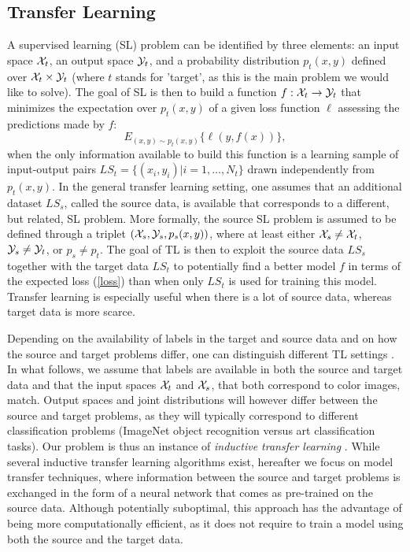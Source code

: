 \subsection{Transfer Learning}
\label{subsec: tl}

A supervised learning (SL) problem can be identified by three elements: an input space ${\cal X}_t$, an output space ${\cal Y}_t$, and a probability distribution $p_t(x,y)$ defined over ${\cal X}_t\times {\cal Y}_t$ (where $t$ stands for 'target', as this is the main problem we would like to solve). The goal of SL is then to build a function $f:{\cal X}_t\rightarrow{\cal Y}_t$ that minimizes the expectation over $p_t(x,y)$ of a given loss function $\ell$ assessing the predictions made by $f$:
\begin{equation}\label{loss}
  E_{(x,y)\sim p_t(x,y)} \{\ell(y,f(x))\},
\end{equation}
when the only information available to build this function is a learning sample of input-output pairs $LS_t=\{(x_i,y_i)|i=1,\ldots,N_t\}$ drawn independently from $p_t(x,y)$. In the general transfer learning setting, one assumes that an additional dataset $LS_s$, called the source data, is available that corresponds to a different, but related, SL problem. More formally, the source SL problem is assumed to be defined through a triplet $({\cal X}_s,{\cal Y}_s,p_s(x,y))$, where at least either ${\cal X}_s\neq {\cal X}_t$, ${\cal Y}_s\neq {\cal Y}_t$, or $p_s\neq p_t$. The goal of TL is then to exploit the source data $LS_s$ together with the target data $LS_t$ to potentially find a better model $f$ in terms of the expected loss (\ref{loss}) than when only $LS_t$ is used for training this model. Transfer learning is especially useful when there is a lot of source data, whereas target data is more scarce.

Depending on the availability of labels in the target and source data and on how the source and target problems differ, one can distinguish different TL settings \cite{pan2010survey}. In what follows, we assume that labels are available in both the source and target data and that the input spaces ${\cal X}_t$ and ${\cal X}_s$, that both correspond to color images, match. Output spaces and joint distributions will however differ between the source and target problems, as they will typically correspond to different classification problems (ImageNet object recognition versus art classification tasks). Our problem is thus an instance of \textit{inductive transfer learning} \cite{pan2010survey}. While several inductive transfer learning algorithms exist, hereafter we focus on model transfer techniques, where information between the source and target problems is exchanged in the form of a neural network that comes as pre-trained on the source data. Although potentially suboptimal, this approach has the advantage of being more computationally efficient, as it does not require to train a model using both the source and the target data.


